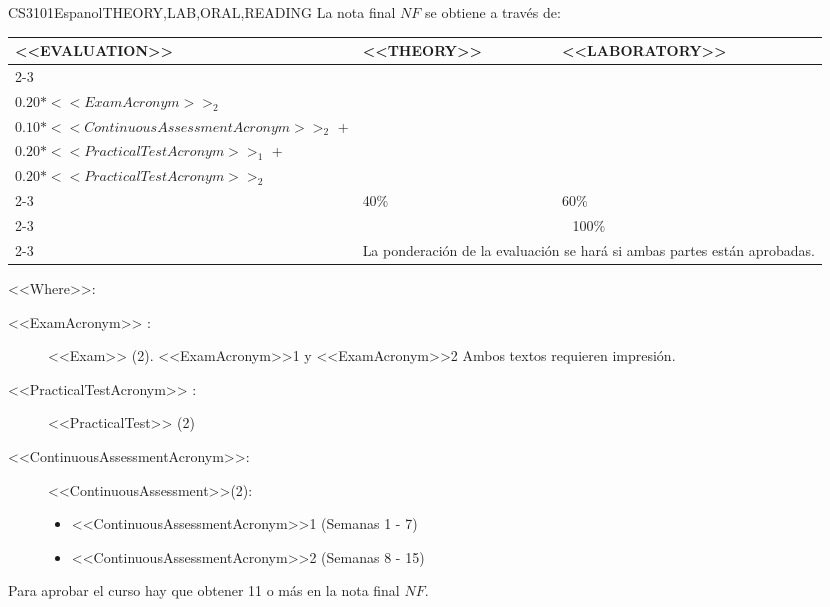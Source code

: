   \begin{evaluation}{CS3101}{Espanol}{THEORY,LAB,ORAL,READING}
  La nota final $NF$ se obtiene a través de: \\
 
  \begin{tabularx}{0.9\textwidth}{|X|p{}|p{}|} \hline
  \multirow{4}{*}{\uppercase{<<Evaluation>>}} & \uppercase{<<Theory>>} & \uppercase{<<Laboratory>>} \\ \cline{2-3}
  & %
      \begin{minipage}{0.95\textwidth}
      \begin{tabular}{l}
        $0.20*<<ExamAcronym>>_{1}$  + \\
        $0.20*<<ExamAcronym>>_{2}$ 
      \end{tabular} 
      \end{minipage} 
  & %
      \begin{minipage}{0.95\textwidth}
      \begin{tabular}{l}
        $0.10*<<ContinuousAssessmentAcronym>>_{1}$  + \\
        $0.10*<<ContinuousAssessmentAcronym>>_{2}$  + \\
        $0.20*<<PracticalTestAcronym>>_{1}$  +  \\
        $0.20*<<PracticalTestAcronym>>_{2}$
      \end{tabular} 
      \end{minipage}                 \\ \cline{2-3}
  
  & %
  40\% 
  & %
  60\% \\ \cline{2-3}
  & \multicolumn{2}{|c|}{100\%}  \\ \cline{2-3}
  & \multicolumn{2}{|c|}{La ponderación de la evaluación se hará si ambas partes están aprobadas.}  \\ \hline
  \end{tabularx}
    
  \vspace{2mm}
  \noindent <<Where>>:
  \begin{description}
    \item[<<ExamAcronym>> :] <<Exam>> (2). <<ExamAcronym>>1 y <<ExamAcronym>>2  Ambos textos requieren impresión.
    \item[<<PracticalTestAcronym>> :] <<PracticalTest>> (2)
    \item[<<ContinuousAssessmentAcronym>>:]<<ContinuousAssessment>>(2):
      \begin{itemize}
          \item <<ContinuousAssessmentAcronym>>1 (Semanas 1 - 7) 
          \item <<ContinuousAssessmentAcronym>>2 (Semanas 8 - 15)
      \end{itemize}
  \end{description}

  \noindent Para aprobar el curso hay que obtener 11 o más en la nota final $NF$.
  \end{evaluation}

